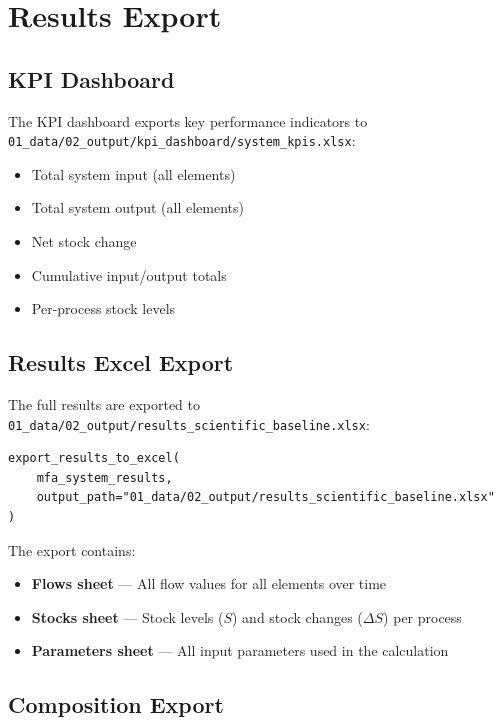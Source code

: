 \chapter{Results Export}
\label{ch:export}

\section{KPI Dashboard}

The KPI dashboard exports key performance indicators to \texttt{01\_data/02\_output/kpi\_dashboard/system\_kpis.xlsx}:

\begin{itemize}
  \item Total system input (all elements)
  \item Total system output (all elements)
  \item Net stock change
  \item Cumulative input/output totals
  \item Per-process stock levels
\end{itemize}

\section{Results Excel Export}

The full results are exported to \texttt{01\_data/02\_output/results\_scientific\_baseline.xlsx}:

\begin{lstlisting}[style=python]
export_results_to_excel(
    mfa_system_results,
    output_path="01_data/02_output/results_scientific_baseline.xlsx"
)
\end{lstlisting}

The export contains:
\begin{itemize}
  \item \textbf{Flows sheet} --- All flow values for all elements over time
  \item \textbf{Stocks sheet} --- Stock levels ($S$) and stock changes ($\Delta S$) per process
  \item \textbf{Parameters sheet} --- All input parameters used in the calculation
\end{itemize}

\section{Composition Export}

